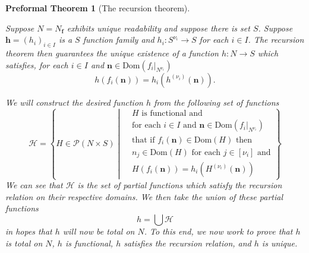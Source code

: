 \documentclass[oneside, 12pt]{book}
\theoremstyle{break}
\newtheorem{preformal definition}[definition]{Preformal Definition}
\newtheorem{preformal theorem}[theorem]{Preformal Theorem}
\newcommand{\bv}[1]{\boldsymbol{#1}}
\newcommand{\mc}[1]{\mathcal{#1}}
\begin{document}
			\begin{preformal theorem}[The recursion theorem]
				\label{thm:recursion theorem}
				
				Suppose $N=N_{\bv{f}}$ exhibits unique readability and suppose there is set $S$.
				Suppose $\bv{h} = (h_i)_{i\in I}$ is a $S$ function family and $h_i:S^{\nu_i} \to S$ for each $i\in I$.
				The recursion theorem then guarantees the unique existence of a function $h:N \to S$ which satisfies, for each $i\in I$ and $\bv{n} \in \text{Dom}(f_i|_{N^{\nu_i}})$
				\begin{equation*}
					h(f_i(\bv{n})) = h_i(h^{(\nu_i)}(\bv{n})).
				\end{equation*}
				
				We will construct the desired function $h$ from the following set of functions
				\begin{equation*}
					\mc{H} = \left\{
					H \in \mc{P}(N\times S) \middle| \begin{aligned}
						&H\text{ is functional and}\\
						&\text{for each } i \in I \text{ and } \bv{n} \in \text{Dom}(f_i|_{N^{\nu_i}})\\
						&\text{that if } f_i(\bv{n}) \in \text{Dom}(H) \text{ then}\\
						&n_j \in \text{Dom}(H) \text{ for each } j \in [\nu_i] \text{ and}\\
						&H(f_i(\bv{n})) = h_i\left(H^{(\nu_i)}(\bv{n})\right)
					\end{aligned}
					\right\}
				\end{equation*}
				We can see that $\mc{H}$ is the set of partial functions which satisfy the recursion relation on their respective domains.
				We then take the union of these partial functions
				\begin{equation*}
					h = \bigcup \mc{H}
				\end{equation*}
				in hopes that $h$ will now be total on $N$.
				To this end, we now work to prove that $h$ is total on $N$, $h$ is functional, $h$ satisfies the recursion relation, and $h$ is unique.
				

\end{preformal theorem}
\end{document}
